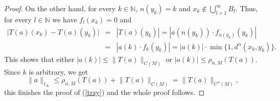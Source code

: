 \documentclass[11pt, reqno]{amsart}
\begin{document}
\begin{proof}
    On the other hand, for every $k\in\mathbb{N}$, $n(y_k)=k$ and $x_k\not\in \bigcup_{l=1}^\infty B_l$. Thus, for every $l \in \mathbb{N}$ we have  $f_l(x_k)=0$ and
    \begin{eqnarray*}
    \vert T(a)(x_k)- T(a)(y_k) \vert&=&|T(a)(y_k)|=|a(n(y_k))\cdot f_{n(y_k)}(y_k)|\\
    &= &|a(k) \cdot f_k(y_k)|=|a(k)| \cdot \min\{1,d^{\alpha}(x_k,y_k)\}.
    \end{eqnarray*}
    This shows that either $|a(k)|\leq\lVert T(a)\rVert_{C(M)}$ or $|a(k)|\leq \rho_{\alpha, M}(T(a))$. Since $k$ is arbitrary, we get
    \[
    \lVert a\rVert_{\ell_\infty}\leq \rho_{\alpha, M}(T(a)) + \lVert T(a)\rVert_{C(M)} = \lVert T(a)\rVert_{C^\alpha(M)},
    \]
    this finishes the proof of (\ref{trzy}) and the whole proof follows.
\end{proof}








\printbibliography%
\end{document}
